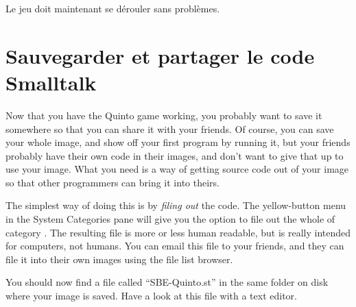 \documentclass[a4paper,10pt,twoside]{book}
\begin{document}
Le jeu doit maintenant se dérouler sans problèmes.


\section{Sauvegarder et partager le code Smalltalk}
\label{sec:Monticello}

Now that you have the Quinto game working, you probably want to save it somewhere so that you can share it with your friends. Of course, you can save your whole \squeak image, and show off your first program by running it, but your friends probably have their own code in their images, and don't want to give that up to use your image.
What you need is a way of getting source code out of your \squeak image so that other programmers can bring it into theirs.

The simplest way of doing this is by \emph{filing out} the code.  The yellow-button menu in the System Categories pane will give you the option to file out the whole of category .
The resulting file is more or less human readable, but is really intended for computers, not humans.
You can email this file to your friends, and they can file it into their own \squeak images using the file list browser.

You should now find a file called ``SBE-Quinto.st'' in the same folder on disk where your image is saved.
Have a look at this file with a text editor.

\end{document}
